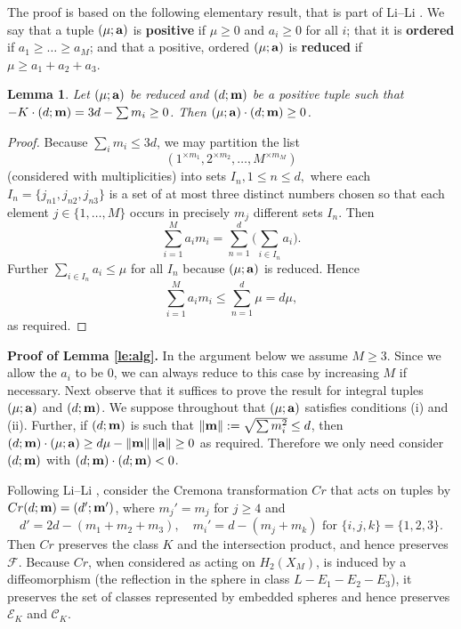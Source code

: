 \documentclass[11pt]{amsart}
\newcommand{\labell}[1] {\label{#1}}
\newcommand{\1}{{{\mathchoice {\rm 1\mskip-4mu l} {\rm 1\mskip-4mu l}
{\rm 1\mskip-4.5mu l} {\rm 1\mskip-5mu l}}}}
\newcommand{\ba} {{\bf a}}
\newcommand{\bm} {{\bf m}}
\newcommand{\Cc}{{\mathcal C}}
\newcommand{\Ff}{{\mathcal F}}
\newcommand{\Ee}{{\mathcal E}}
\newtheorem{lemma}[theorem]{Lemma}
\numberwithin{figure}{section}
\numberwithin{equation}{section}
\newcommand{\NI}{{\noindent}}
\begin{document}
The proof is based on the following elementary result, that is part of
 Li--Li  \cite[Lemma~3.4]{LL2}.
We say that a tuple
 $(\mu;\ba)$ is {\bf positive} if $\mu\ge 0$ and $a_i\ge 0$ for all $i$; that it is
 {\bf ordered} if $a_1\ge\dots\ge a_M$;
 and that a positive, ordered $(\mu;\ba)$  is {\bf reduced} if $\mu\ge a_1+a_2+a_3$. 


\begin{lemma}\labell{le:red}  Let $(\mu;\ba)$ be reduced and $(d;\bm)$ be a positive tuple such that
$-K\cdot (d;\bm) = 3d-\sum m_i \ge 0$.  Then $(\mu;\ba)\cdot(d;\bm) \ge 0$.
\end{lemma}
\begin{proof}
  Because $\sum_im_i\le 3d$,  we may
 partition the list 
 $$
 (1^{\times m_1}, 2^{\times m_2},\dots, M^{\times m_M})
 $$
  (considered with multiplicities) into sets $I_n, 1\le n \le d,$
 where
 each $I_n = \{j_{n1},j_{n2},j_{n3}\}$ is a set of at most three distinct numbers chosen so that each element $j\in \{1,\dots, M\}$
 occurs in precisely $m_j$ different sets $I_n$.   
 Then 
 $$
\sum_{i=1}^M a_im_i = \sum_{n=1}^{d}\bigl(\sum_{i\in I_n}a_i\bigr).
$$
Further $\sum_{i\in I_n}a_i\le \mu$ for all $I_n$ because $(\mu;\ba)$ is reduced.  Hence
 $$
\sum_{i=1}^M a_im_i \le \sum_{n=1}^{d} \mu = d\mu,
 $$
as required.
\end{proof}
 
\NI{\bf Proof of Lemma \ref{le:alg}.} In the argument below we assume $M\ge 3$.
Since we allow the $a_i$ to be $0$, we can always reduce to this case by increasing $M$ if necessary.
  Next observe that it suffices to prove the result for integral tuples
$(\mu;\ba)$ and  $(d;\bm)$.  We suppose throughout 
that $(\mu;\ba)$ satisfies conditions (i) and (ii).
Further, if  
 $(d;\bm)$ is such that $\|\bm\| : = \sqrt{\sum m_i^2}\le d$,
then $(d;\bm)\cdot(\mu;\ba) \ge d\mu-\|\bm\|\,\|\ba\| \ge0 $ as required. Therefore  
we only need consider $(d;\bm)$ with $(d;\bm)\cdot (d;\bm)< 0$. 



 Following  Li--Li \cite{LL2}, consider the Cremona transformation $Cr$ that acts on tuples by
$
Cr(d;\bm) = (d';\bm')$, where $m_j'=m_j$ for $j\ge 4$ and 
$$
d' = 2d-(m_1+m_2+m_3), \quad m_i' = d-(m_j+m_k) \mbox{ for } \{i,j,k\}=\{1,2,3\}.
$$
Then $Cr$ preserves the class $K$ and the intersection product,
 and hence preserves  $\Ff$.   Because $Cr$, when considered as acting on 
 $H_2(X_M)$,  is induced by a diffeomorphism (the reflection in the sphere in
 class $L-E_1-E_2-E_3$), it preserves the set of classes represented by embedded spheres and hence preserves $\Ee_K$ and $\Cc_K$.
 
\end{document}
